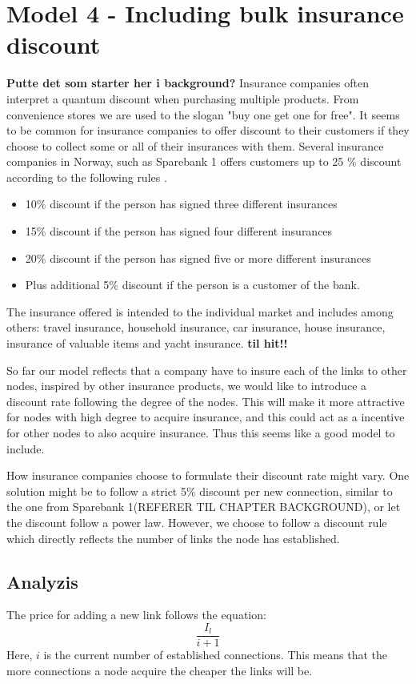 \section{Model 4 - Including bulk insurance discount}
\textbf{Putte det som starter her i background?}
Insurance companies often interpret a quantum discount when purchasing multiple products. From convenience stores we are used to the slogan "buy one get one for free". It seems to be common for insurance companies to offer discount to their customers if they choose to collect some or all of their insurances with them. Several insurance companies in Norway, such as Sparebank 1 offers customers up to 25 $\%$ discount according to the following rules \cite{sparebank1}. 

\begin{itemize}

\item 10$\%$ discount if the person has signed three different insurances
\item 15$\%$ discount if the person has signed four different insurances
\item 20$\%$ discount if the person has signed five or more different insurances
\item Plus additional 5$\%$ discount if the person is a customer of the bank. 

\end{itemize}

The insurance offered is intended to the individual market and includes among others: travel insurance, household insurance, car insurance, house insurance, insurance of valuable items and yacht insurance.
\textbf{til hit!!}

So far our model reflects that a company have to insure each of the links to other nodes, inspired by other insurance products, we would like to introduce a discount rate following the degree of the nodes. This will make it more attractive for nodes with high degree to acquire insurance, and this could act as a incentive for other nodes to also acquire insurance. Thus this seems like a good model to include.  

How insurance companies choose to formulate their discount rate might vary. One solution might be to follow a strict 5$\%$ discount per new connection, similar to the one from Sparebank 1(REFERER TIL CHAPTER BACKGROUND), or let the discount follow a power law. However, we choose to follow a discount rule which directly reflects the number of links the node has established. 
\subsection{Analyzis}
The price for adding a new link follows the equation:
\begin{equation}
\frac{I_{l}}{i+1}
\label{eq:discount0}
\end{equation}
Here, $i$ is the current number of established connections. This means that the more connections a node acquire the cheaper the links will be. 

